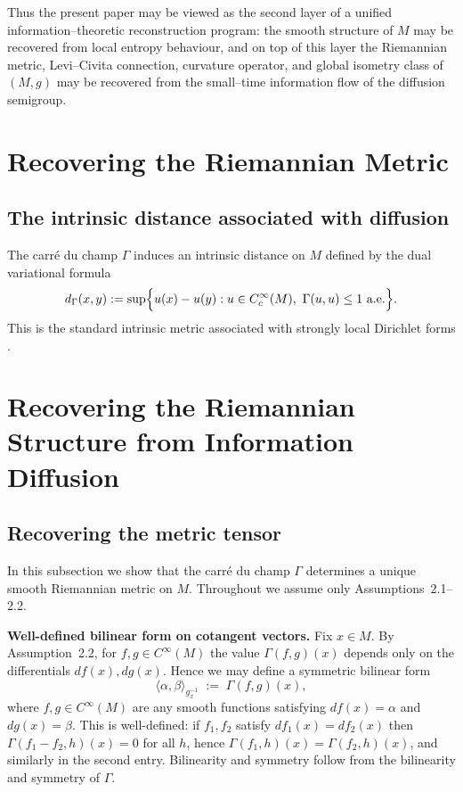\documentclass[11pt]{amsart}
\theoremstyle{definition}
\theoremstyle{remark}
\begin{document}
Thus the present paper may be viewed as the second layer of a unified
information--theoretic reconstruction program: the smooth structure of $M$
may be recovered from local entropy behaviour, and on top of this layer the
Riemannian metric, Levi--Civita connection, curvature operator, and global
isometry class of $(M,g)$ may be recovered from the small--time information
flow of the diffusion semigroup.

\section{Recovering the Riemannian Metric}


\subsection{The intrinsic distance associated with diffusion}

The carré du champ $\Gamma$ induces an intrinsic distance on $M$ defined by
the dual variational formula
\begin{equation}\label{eq:dual-dGamma}
d_\Gamma(x,y)
:=
\sup\Bigl\{
u(x)-u(y):
u\in C_c^\infty(M),\ \Gamma(u,u)\le 1\ \text{a.e.}
\Bigr\}.
\end{equation}
This is the standard intrinsic metric associated with strongly local Dirichlet
forms \cite{FukushimaOshimaTakeda2011}.

\section{Recovering the Riemannian Structure from Information Diffusion}

\subsection{Recovering the metric tensor}\label{subsec:recover-metric}

In this subsection we show that the carré du champ $\Gamma$ determines a unique smooth
Riemannian metric on $M$.  Throughout we assume only Assumptions~2.1--2.2.

\medskip
\noindent\textbf{Well-defined bilinear form on cotangent vectors.}
Fix $x\in M$.  By Assumption~2.2, for $f,g\in C^\infty(M)$ the value $\Gamma(f,g)(x)$ depends
only on the differentials $df(x),dg(x)$.  Hence we may define a symmetric bilinear form
\begin{equation}\label{eq:cometric-def}
\langle \alpha,\beta\rangle_{g_x^{-1}}
\;:=\;
\Gamma(f,g)(x),
\end{equation}
where $f,g\in C^\infty(M)$ are any smooth functions satisfying $df(x)=\alpha$ and $dg(x)=\beta$.
This is well-defined: if $f_1,f_2$ satisfy $df_1(x)=df_2(x)$ then $\Gamma(f_1-f_2,h)(x)=0$
for all $h$, hence $\Gamma(f_1,h)(x)=\Gamma(f_2,h)(x)$, and similarly in the second entry.
Bilinearity and symmetry follow from the bilinearity and symmetry of $\Gamma$.
\end{document}
